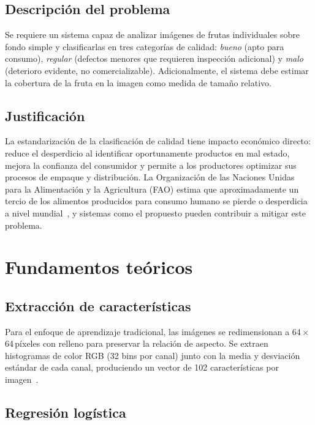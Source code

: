 \documentclass[conference]{IEEEtran}
\begin{document}
\subsection{Descripción del problema}
Se requiere un sistema capaz de analizar imágenes de frutas individuales sobre fondo simple y clasificarlas en tres categorías de calidad: \emph{bueno} (apto para consumo), \emph{regular} (defectos menores que requieren inspección adicional) y \emph{malo} (deterioro evidente, no comercializable). Adicionalmente, el sistema debe estimar la cobertura de la fruta en la imagen como medida de tamaño relativo.

\subsection{Justificación}
La estandarización de la clasificación de calidad tiene impacto económico directo: reduce el desperdicio al identificar oportunamente productos en mal estado, mejora la confianza del consumidor y permite a los productores optimizar sus procesos de empaque y distribución. La Organización de las Naciones Unidas para la Alimentación y la Agricultura (FAO) estima que aproximadamente un tercio de los alimentos producidos para consumo humano se pierde o desperdicia a nivel mundial~\cite{fao_waste}, y sistemas como el propuesto pueden contribuir a mitigar este problema.

\section{Fundamentos teóricos}

\subsection{Extracción de características}
Para el enfoque de aprendizaje tradicional, las imágenes se redimensionan a 64\,$\times$\,64\,píxeles con relleno para preservar la relación de aspecto. Se extraen histogramas de color RGB (32 bins por canal) junto con la media y desviación estándar de cada canal, produciendo un vector de 102 características por imagen~\cite{histogram_features}.

\subsection{Regresión logística}
\end{document}
